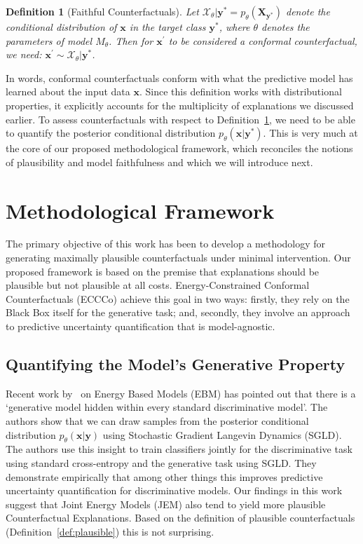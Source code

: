 \documentclass{article}
\newtheorem{definition}{Definition}[section]
\begin{document}
\begin{definition}[Faithful Counterfactuals]
  \label{def:faithful}
  Let $\mathcal{X}_{\theta}|\mathbf{y}^* = p_{\theta}(\mathbf{X}_{\mathbf{y}^*})$ denote the conditional distribution of $\mathbf{x}$ in the target class $\mathbf{y}^*$, where $\theta$ denotes the parameters of model $M_{\theta}$. Then for $\mathbf{x}^{\prime}$ to be considered a conformal counterfactual, we need: $\mathbf{x}^{\prime} \sim \mathcal{X}_{\theta}|\mathbf{y}^*$.
\end{definition}

In words, conformal counterfactuals conform with what the predictive model has learned about the input data $\mathbf{x}$. Since this definition works with distributional properties, it explicitly accounts for the multiplicity of explanations we discussed earlier. To assess counterfactuals with respect to Definition~\ref{def:faithful}, we need to be able to quantify the posterior conditional distribution $p_{\theta}(\mathbf{x}|\mathbf{y}^*)$. This is very much at the core of our proposed methodological framework, which reconciles the notions of plausibility and model faithfulness and which we will introduce next.

\section{Methodological Framework}\label{meth}

The primary objective of this work has been to develop a methodology for generating maximally plausible counterfactuals under minimal intervention. Our proposed framework is based on the premise that explanations should be plausible but not plausible at all costs. Energy-Constrained Conformal Counterfactuals (ECCCo) achieve this goal in two ways: firstly, they rely on the Black Box itself for the generative task; and, secondly, they involve an approach to predictive uncertainty quantification that is model-agnostic.

\subsection{Quantifying the Model's Generative Property}

Recent work by~\citet{grathwohl2020your} on Energy Based Models (EBM) has pointed out that there is a `generative model hidden within every standard discriminative model'. The authors show that we can draw samples from the posterior conditional distribution $p_{\theta}(\mathbf{x}|\mathbf{y})$ using Stochastic Gradient Langevin Dynamics (SGLD). The authors use this insight to train classifiers jointly for the discriminative task using standard cross-entropy and the generative task using SGLD. They demonstrate empirically that among other things this improves predictive uncertainty quantification for discriminative models. Our findings in this work suggest that Joint Energy Models (JEM) also tend to yield more plausible Counterfactual Explanations. Based on the definition of plausible counterfactuals (Definition~\ref{def:plausible}) this is not surprising. 
\end{document}
